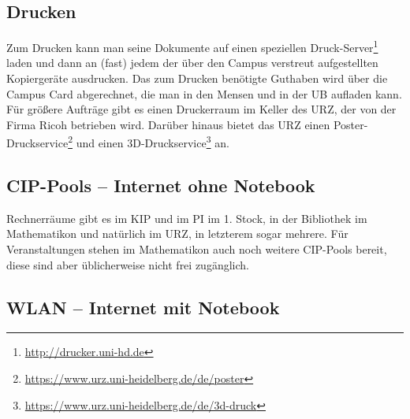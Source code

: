 
\vspace*{-2mm}
\subsection{Drucken}
\vspace*{-1mm}
Zum Drucken kann man seine Dokumente auf einen speziellen Druck-Server\footnote{\url{http://drucker.uni-hd.de}} laden und dann an (fast) jedem der über den Campus verstreut aufgestellten Kopiergeräte ausdrucken. Das zum Drucken benötigte Gut\-ha\-ben wird über die Campus Card abgerechnet, die man in den Mensen und in der \gls{UB} aufladen kann. Für größere Aufträge gibt es einen Druckerraum im Keller des \gls{URZ}, der von der Firma Ricoh betrieben wird. Darüber hinaus bietet das URZ einen Poster-Druckservice\footnote{\url{https://www.urz.uni-heidelberg.de/de/poster}} und einen 3D-Druckservice\footnote{\url{https://www.urz.uni-heidelberg.de/de/3d-druck}} an.

\vspace*{-2mm}
\subsection{CIP-Pools -- Internet ohne Notebook}
\vspace*{-1mm}
Rechnerräume gibt es im \gls{KIP} und im \gls{PI} im 1. Stock, in der Bibliothek im \gls{Mathematikon} und natürlich im \gls{URZ}, in letzterem sogar mehrere. Für Veranstaltungen stehen im Mathematikon auch noch weitere CIP-Pools bereit, diese sind aber üblicherweise nicht frei zugänglich.

\subsection{WLAN -- Internet mit Notebook}

